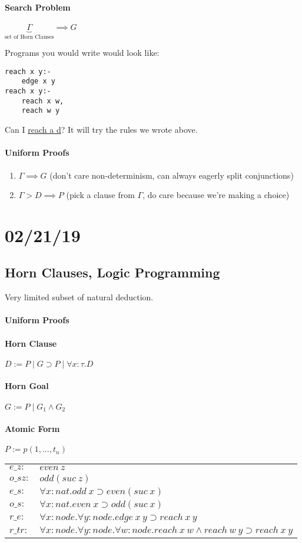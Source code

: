 \documentclass[12 pt]{article}
\begin{document}
	\paragraph{Search Problem} $\underbrace{\Gamma}_{\text{set of
	Horn Clauses}} \implies G$

	Programs you would write would look like:
	\begin{verbatim}
reach x y:-
    edge x y
reach x y:-
    reach x w,
    reach w y
\end{verbatim}
	Can I \underline{reach a d}? It will try the rules we wrote
	above.
	\paragraph{Uniform Proofs}
	\begin{enumerate}
		\item $\Gamma \implies G$ (don't care non-determinism, can
		      always eagerly split conjunctions)
		\item $\Gamma > D \implies P$ (pick a clause from $\Gamma$, do
		      care because we're making a choice)
	\end{enumerate}
	\section{02/21/19}
	\subsection{Horn Clauses, Logic Programming}
	Very limited subset of natural deduction.
	\paragraph{Uniform Proofs}
	\paragraph{Horn Clause} $D := P \mid G \supset P \mid \forall x
: \tau . D$
	\paragraph{Horn Goal} $G := P \mid G_1 \land G_2$
	\paragraph{Atomic Form} $P := p(1, \ldots, t_n)$
	\\
	\begin{tabular}{l l}
		$e\_z:$ & $even\ z$
		\\ $o\_sz:$ & $odd(suc\ z)$
		\\ $e\_s:$ & $\forall x:nat. odd \ x \supset even (suc\ x)$
		\\ $o\_s:$ & $\forall x : nat. even\ x \supset odd(suc\ x)$
		\\ $r\_e:$ & $\forall x: node. \forall y:node . edge\ x\ y \supset reach\ x\ y$
		\\ $r\_tr:$ & $\forall x: node.\forall y: node. \forall w:node. reach\ x \ w \land reach\ w\ y \supset reach\ x \ y$
	\end{tabular}
\end{document}
